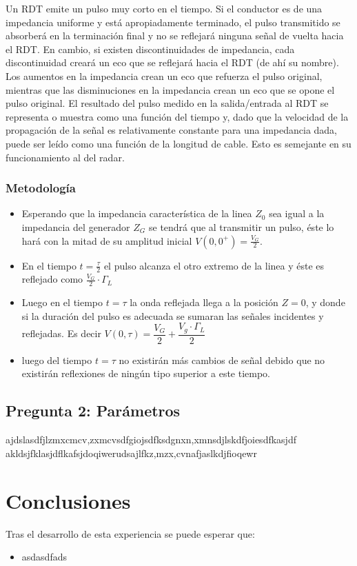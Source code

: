 \documentclass[11pt,onecolumn]{article}
\begin{document}
Un RDT emite un pulso muy corto en el tiempo. Si el conductor es de una impedancia uniforme
y está apropiadamente terminado, el pulso transmitido se absorberá en la terminación final
y no se reflejará ninguna señal de vuelta hacia el RDT. En cambio, si existen
discontinuidades de impedancia, cada discontinuidad creará un eco que se reflejará hacia el
RDT (de ahí su nombre). Los aumentos en la impedancia crean un eco que refuerza el pulso
original, mientras que las disminuciones en la impedancia crean un eco que se opone el
pulso original. El resultado del pulso medido en la salida/entrada al RDT se representa o
muestra como una función del tiempo y, dado que la velocidad de la propagación de la señal
es relativamente constante para una impedancia dada, puede ser leído como una función de la
longitud de cable. Esto es semejante en su funcionamiento al del radar.

\subsubsection*{Metodología}

\begin{itemize}
\item Esperando que la impedancia característica de la linea $Z_{0}$ sea igual a la impedancia del generador $Z_{G}$ se tendrá que al transmitir un pulso, éste lo hará con la mitad de su amplitud inicial $ V(0,0^{+}) = \frac{V_{G}}{2}$. 

\item En el tiempo $t = \frac{\tau}{2}$ el pulso alcanza el otro extremo de la linea y éste es reflejado como $\frac{V_{G}}{2} \cdot \Gamma_{L}$


\item Luego en el tiempo $t = \tau$ la onda reflejada llega a la posición $Z = 0$, y donde si la duración del pulso es adecuada se sumaran las señales incidentes y reflejadas. Es decir $V(0,\tau) = \dfrac{V_{G}}{2} + \dfrac{V_{g}\cdot \Gamma_{L}}{2}$ 

\item luego del tiempo $t = \tau$ no existirán más cambios de señal debido que no existirán reflexiones de ningún tipo superior a este tiempo.

\end{itemize}
\subsection*{Pregunta 2: Parámetros}
ajdslasdfjlzmxcmcv,zxmcvsdfgiojsdfksdgnxn,xmnsdjlskdfjoiesdfkasjdf
akldsjfklasjdflkafsjdoqiwerudsajlfkz,mzx,cvnafjaslkdjfioqewr










\newpage
\section{Conclusiones}

Tras el desarrollo de esta experiencia se puede esperar que:
\begin{itemize}
\item asdasdfads

\end{itemize}
\end{document}
